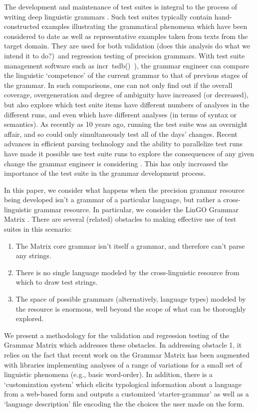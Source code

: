 \documentclass[11pt]{article}
\newcommand{\itsdb}{\mbox{\sf \lbrack incr tsdb()\rbrack}}
\begin{document}
The development and maintenance of test suites is integral to the
process of writing deep linguistic grammars \cite{Oep:Fli:98,But:Kin:03}.
Such test suites typically contain hand-constructed examples
illustrating the grammatical phenomena which have been considered to
date as well as representative examples taken from texts from the
target domain.  They are used for both validation (does this analysis
do what we intend it to do?)\ and regression testing of precision
grammars.  With test suite management software such as \itsdb\
\cite{Oepen:01}), the grammar engineer can compare the linguistic
`competence' of the current grammar to that of previous stages of the
grammar.  In such comparisons, one can not only find out if the
overall coverage, overgeneration and degree of ambiguity have
increased (or decreased), but also explore which test suite items have
different numbers of analyses in the different runs, and even which
have different analyses (in terms of syntax or semantics).  As
recently as 10 years ago, running the test suite was an overnight
affair, and so could only simultaneously test all of the days'
changes.  Recent advances in efficient parsing technology
\cite{Oep:Fli:Tsu:02} and the ability to parallelize test runs have made
it possible use test suite runs to explore the consequences of any
given change the grammar engineer is considering
\cite{Oep:Ben:Cal:Fli:Sie:02}.  This has only increased the importance of
the test suite in the grammar development process.

In this paper, we consider what happens when the precision grammar
resource being developed isn't a grammar of a particular language, but
rather a cross-linguistic grammar resource.  In particular, we
consider the LinGO Grammar Matrix
\cite{Ben:Fli:Oep:02,Ben:Fli:05,Dre:Ben:05}.  There are several
(related) obstacles to making effective use of test suites in this
scenario:

\begin{enumerate}
\item The Matrix core grammar isn't itself a grammar, and therefore
can't parse any strings.
\item There is no single language modeled by the cross-linguistic resource
from which to draw test strings.
\item The space of possible grammars (alternatively, language types) modeled
by the resource is enormous, well beyond the scope of what can be 
thoroughly explored.
\end{enumerate}

We present a methodology for the validation and regression testing of
the Grammar Matrix which addresses these obstacles.  In addressing
obstacle 1, it relies on the fact that recent work on the Grammar
Matrix \cite{Ben:Fli:05,Dre:Ben:05} has been augmented with libraries
implementing analyses of a range of variations for a small set of
linguistic phenomena (e.g., basic word-order).  In addition, there is
a `customization system' which elicits typological information about a
language from a web-based form and outputs a customized
`starter-grammar' as well as a `language description' file encoding
the the choices the user made on the form.
\end{document}
